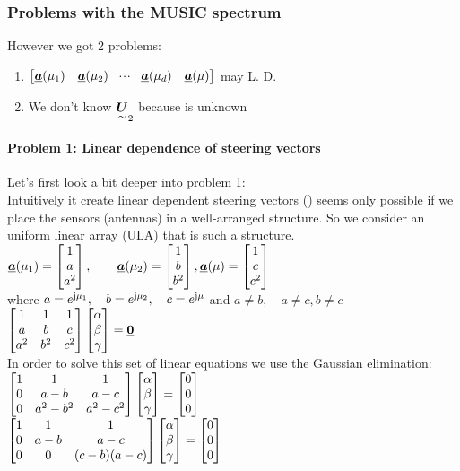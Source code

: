 \subsubsection{Problems with the MUSIC spectrum}
However we got 2 problems:
\begin{enumerate}
	\item $\begin{bmatrix} \underline{\boldsymbol {a}}(\mu_1)& \underline{\boldsymbol {a}}(\mu_2) & \!\cdot \!\cdot\!\cdot\! & \underline{\boldsymbol {a}}(\mu_d) & \underline{\boldsymbol {a}}(\mu) \end{bmatrix}$ may L. D.
	\item We don't know $\underset{\sim}{\boldsymbol {U}}_2$ because  is unknown 
\end{enumerate}

\paragraph{Problem 1: Linear dependence of steering vectors}
Let's first look a bit deeper into problem 1:\\
Intuitively it create linear dependent steering vectors () seems only possible if we place the sensors (antennas) in a well-arranged structure. So we consider an uniform linear array (ULA) that is such a structure.\\
$\underline{\boldsymbol {a}}(\mu_1)=\begin{bmatrix} 1\\a\\a^2 \end{bmatrix},\qquad\underline{\boldsymbol {a}}(\mu_2)=\begin{bmatrix} 1\\b\\b^2 \end{bmatrix},\underline{\boldsymbol {a}}(\mu)=\begin{bmatrix} 1\\c\\c^2 \end{bmatrix}$\\
where $a=e^{\mathrm{j}\mu_1},\quad b=e^{\mathrm{j}\mu_2},\quad c=e^{\mathrm{j}\mu}$ and $a\neq b,\quad a\neq c, b\neq c$\\
$\begin{bmatrix} 1&1&1\\a&b&c\\a^2&b^2&c^2 \end{bmatrix}\begin{bmatrix} \alpha\\\beta\\\gamma \end{bmatrix}=\underline{\boldsymbol {0}}$\\
In order to solve this set of linear equations we use the Gaussian elimination:\\
$\begin{bmatrix} 1&1&1\\0&a-b&a-c\\0&a^2-b^2&a^2-c^2 \end{bmatrix}\begin{bmatrix} \alpha\\\beta\\\gamma \end{bmatrix}=\begin{bmatrix} 0\\0\\0 \end{bmatrix}$\\
$\begin{bmatrix} 1&1&1\\0&a-b&a-c\\0&0&(c-b)(a-c) \end{bmatrix}\begin{bmatrix} \alpha\\\beta\\\gamma \end{bmatrix}=\begin{bmatrix} 0\\0\\0 \end{bmatrix}$\\
